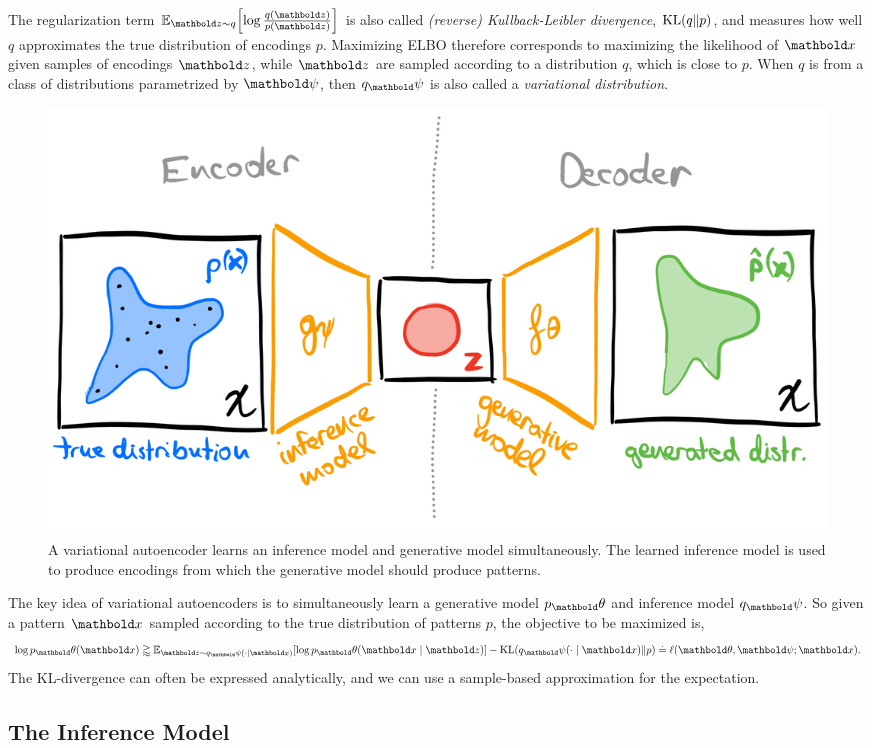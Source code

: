 \documentclass{tufte-handout}
\begin{document}
The regularization term $\E[\vz \sim q]{\log \frac{q(\vz)}{p(\vz)}}$ is also called \emph{(reverse) Kullback-Leibler divergence}, $\KL{q}{p}$, and measures how well $q$ approximates the true distribution of encodings $p$. Maximizing ELBO therefore corresponds to maximizing the likelihood of $\vx$ given samples of encodings $\vz$, while $\vz$ are sampled according to a distribution $q$, which is close to $p$. When $q$ is from a class of distributions parametrized by $\vpsi$, then $q_\vpsi$ is also called a \emph{variational distribution}.

\begin{figure}
    \includegraphics[width=\textwidth]{figures/vae.png}
    \caption{A variational autoencoder learns an inference model and generative model simultaneously. The learned inference model is used to produce encodings from which the generative model should produce patterns.}
\end{figure}

The key idea of variational autoencoders is to simultaneously learn a generative model $p_\vtheta$ and inference model $q_\vpsi$. So given a pattern $\vx$ sampled according to the true distribution of patterns $p$, the objective to be maximized is, \begin{align}
    \log p_\vtheta(\vx) \gtrapprox  \E[\vz \sim q_\vpsi(\cdot \mid \vx)]{\log p_\vtheta(\vx \mid \vz)} - \KL{q_\vpsi(\cdot \mid \vx)}{p} \eqdef \ell(\vtheta, \vpsi; \vx).
\end{align} The KL-divergence can often be expressed analytically, and we can use a sample-based approximation for the expectation.

\subsection{The Inference Model}
\end{document}
